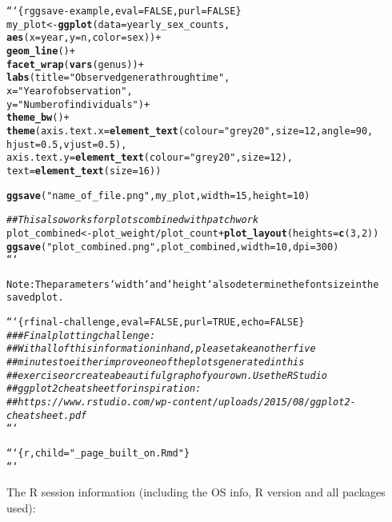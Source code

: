 \documentclass{article}\usepackage[]{graphicx}\usepackage[]{xcolor}
\makeatletter
\newcommand{\hlstr}[1]{\textcolor[rgb]{0.192,0.494,0.8}{#1}}%
\newcommand{\hlcom}[1]{\textcolor[rgb]{0.678,0.584,0.686}{\textit{#1}}}%
\newcommand{\hlkwd}[1]{\textcolor[rgb]{0.737,0.353,0.396}{\textbf{#1}}}%
\newenvironment{kframe}{%
 \def\at@end@of@kframe{}%
 \ifinner\ifhmode%
  \def\at@end@of@kframe{\end{minipage}}%
  \begin{minipage}{\columnwidth}%
 \fi\fi%
 \def\FrameCommand##1{\hskip\@totalleftmargin \hskip-\fboxsep
 \colorbox{shadecolor}{##1}\hskip-\fboxsep
     \hskip-\linewidth \hskip-\@totalleftmargin \hskip\columnwidth}%
 \MakeFramed {\advance\hsize-\width
   \@totalleftmargin\z@ \linewidth\hsize
   \@setminipage}}%
 {\par\unskip\endMakeFramed%
 \at@end@of@kframe}
\newenvironment{knitrout}{}{} %
\makeatother
\begin{document}
\begin{knitrout}
\begin{kframe}
\begin{alltt}
```\{r ggsave-example, eval = FALSE, purl = FALSE\}
my_plot <- \hlkwd{ggplot}(data = yearly_sex_counts,
                  \hlkwd{aes}(x = year, y = n, color = sex)) +
    \hlkwd{geom_line}() +
    \hlkwd{facet_wrap}(\hlkwd{vars}(genus)) +
    \hlkwd{labs}(title = \hlstr{"Observed genera through time"},
        x = \hlstr{"Year of observation"},
        y = \hlstr{"Number of individuals"}) +
    \hlkwd{theme_bw}() +
    \hlkwd{theme}(axis.text.x = \hlkwd{element_text}(colour = \hlstr{"grey20"}, size = 12, angle = 90,
                                     hjust = 0.5, vjust = 0.5),
          axis.text.y = \hlkwd{element_text}(colour = \hlstr{"grey20"}, size = 12),
          text = \hlkwd{element_text}(size = 16))

\hlkwd{ggsave}(\hlstr{"name_of_file.png"}, my_plot, width = 15, height = 10)

\hlcom{## This also works for plots combined with patchwork}
plot_combined <- plot_weight / plot_count + \hlkwd{plot_layout}(heights = \hlkwd{c}(3, 2))
\hlkwd{ggsave}(\hlstr{"plot_combined.png"}, plot_combined, width = 10, dpi = 300)
```

Note: The parameters `width` and `height` also determine the font size in the
saved plot.


```\{r final-challenge, eval = FALSE, purl = TRUE, echo = FALSE\}
\hlcom{### Final plotting challenge:}
\hlcom{##  With all of this information in hand, please take another five}
\hlcom{##  minutes to either improve one of the plots generated in this}
\hlcom{##  exercise or create a beautiful graph of your own. Use the RStudio}
\hlcom{##  ggplot2 cheat sheet for inspiration:}
\hlcom{##  https://www.rstudio.com/wp-content/uploads/2015/08/ggplot2-cheatsheet.pdf}
```

```\{r, child=\hlstr{"_page_built_on.Rmd"}\}
```
\end{alltt}


{\ttfamily\noindent\bfseries{}}\end{kframe}
\end{knitrout}

The R session information (including the OS info, R version and all
packages used):
\end{document}
